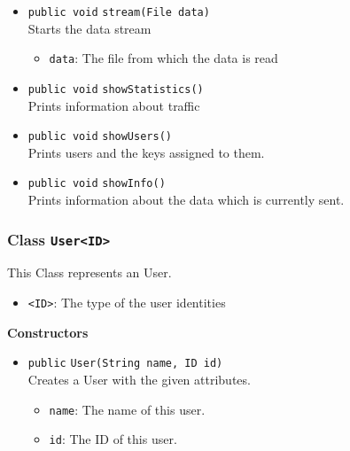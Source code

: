 \begin{itemize}
\item \lstinline|public void| \lstinline|stream|\lstinline|(File data)|\\
Starts the data stream
\begin{itemize}
\item \lstinline|data|: The file from which the data is read
\end{itemize}



\item \lstinline|public void| \lstinline|showStatistics|\lstinline|()|\\
Prints information about traffic



\item \lstinline|public void| \lstinline|showUsers|\lstinline|()|\\
Prints users and the keys assigned to them.



\item \lstinline|public void| \lstinline|showInfo|\lstinline|()|\\
Prints information about the data which is currently sent.



\end{itemize}

\subsubsection{Class \lstinline|User<ID>|}
This Class represents an User. \\



\begin{itemize}
\item \lstinline|<ID>|: The type of the user identities
\end{itemize}


\textbf{Constructors}
\begin{itemize}
\item \lstinline|public| \lstinline|User|\lstinline|(String name, ID id)|\\
Creates a User with the given attributes.
\begin{itemize}
\item \lstinline|name|: The name of this user.
\item \lstinline|id|: The ID of this user.
\end{itemize}



\end{itemize}


